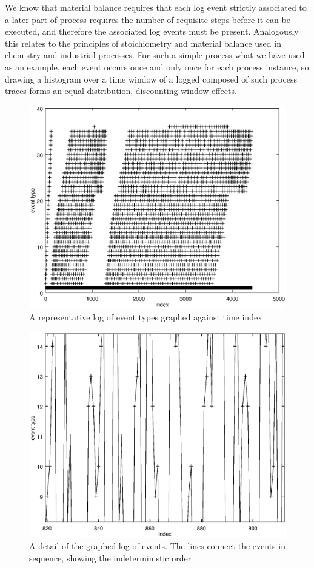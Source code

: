 \documentclass[journal]{IEEEtran}
\begin{document}
We know that material balance requires that each log event strictly associated to a later part of process requires the number of requisite steps before it can be executed, and
therefore the associated log events must be present. Analogously this relates to the principles of stoichiometry and material balance used in chemistry and industrial processes.
For such a simple process what we have used as an example, each event occurs once and only once for each process instance, so drawing a histogram over a time window of a logged
composed of such process traces forms an equal distribution, discounting window effects.

\begin{figure}[tb]
 \centering
 \includegraphics[width=8 cm,keepaspectratio=true]{./representative_log.eps}
 \caption{A representative log of event types graphed against time index}
 \label{figure:events}
\end{figure}

\begin{figure}[tb]
 \centering
 \includegraphics[width=8 cm,keepaspectratio=true]{./detail.eps}
 \caption{A detail of the graphed log of events. The lines connect the events in sequence, showing the indeterministic order}
 \label{figure:zoomed_events}
\end{figure}
\end{document}
